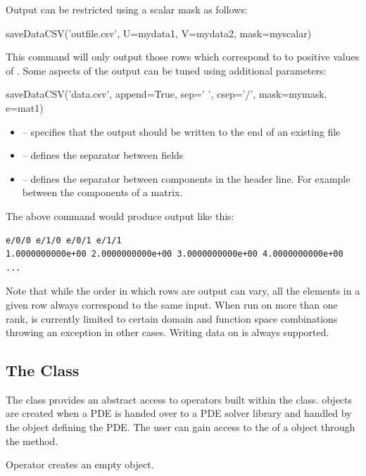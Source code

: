 Output can be restricted using a scalar mask as follows:
\begin{python}
  saveDataCSV('outfile.csv', U=mydata1, V=mydata2, mask=myscalar)
\end{python}
This command will only output those rows which correspond to to positive
values of .
Some aspects of the output can be tuned using additional parameters:
\begin{python}
  saveDataCSV('data.csv', append=True, sep=' ', csep='/', mask=mymask, e=mat1)
\end{python}

\begin{itemize}
 \item {} -- specifies that the output should be written to the end of an existing file
 \item {} -- defines the separator between fields
 \item {} -- defines the separator between components in the header
     line. For example between the components of a matrix.
\end{itemize}
%
The above command would produce output like this:
\begin{verbatim}
e/0/0 e/1/0 e/0/1 e/1/1
1.0000000000e+00 2.0000000000e+00 3.0000000000e+00 4.0000000000e+00
...
\end{verbatim}

Note that while the order in which rows are output can vary, all the elements
in a given row always correspond to the same input.
When run on more than one \MPI rank,  is currently
limited to certain domain and function space combinations throwing an exception
in other cases. Writing data on \ContinuousFunction is always supported.

\subsection{The \Operator Class}
The \Operator class provides an abstract access to operators built
within the \LinearPDE class. \Operator objects are created
when a PDE is handed over to a PDE solver library and handled
by the \LinearPDE object defining the PDE. The user can gain access
to the \Operator of a \LinearPDE object through the 
method.

\begin{classdesc}{Operator}{}
creates an empty \Operator object.
\end{classdesc}

